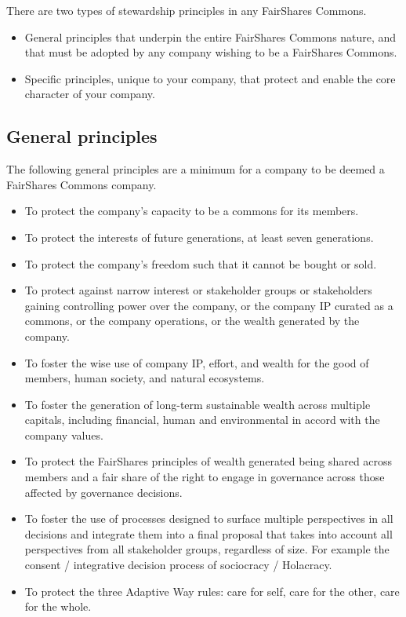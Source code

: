There are two types of stewardship principles in any FairShares Commons.
\begin{itemize}
\item General principles that underpin the entire FairShares Commons nature, and that must be adopted by any company wishing to be a FairShares Commons.
\item Specific principles, unique to your company, that protect and enable the core character of your company.
\end{itemize}


\subsection{General principles}
The following general principles are a minimum for a company to be deemed a FairShares Commons company.
\begin{itemize}
\item To protect the company’s capacity to be a commons for its members.
\item To protect the interests of future generations, at least seven generations.
\item To protect the company’s freedom such that it cannot be bought or sold.
\item To protect against narrow interest or stakeholder groups or stakeholders gaining controlling power over the company, or the company IP curated as a commons, or the company operations, or the wealth generated by the company.
\item To foster the wise use of company IP, effort, and wealth for the good of members, human society, and natural ecosystems.
\item To foster the generation of long-term sustainable wealth across multiple capitals, including financial, human and environmental in accord with the company values.
\item To protect the FairShares principles of wealth generated being shared across members and a fair share of the right to engage in governance across those affected by governance decisions.
\item To foster the use of processes designed to surface multiple perspectives in all decisions and integrate them into a final proposal that takes into account all perspectives from all stakeholder groups, regardless of size. For example the consent / integrative decision process of sociocracy / Holacracy.
\item To protect the three Adaptive Way rules: care for self, care for the other, care for the whole. 
\end{itemize}


